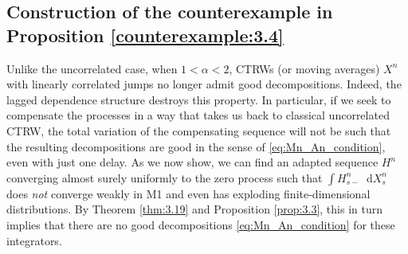 \documentclass[11pt]{article}
\theoremstyle{definition}\newtheorem{example}[theorem]{Example}
\theoremstyle{definition}\newtheorem{counterexample}[theorem]{Counterexample}
\theoremstyle{definition}\newtheorem{remark}[theorem]{Remark}
\theoremstyle{definition}\newtheorem{defi}[theorem]{Definition}
\numberwithin{equation}{section}
\newcommand*\diff{\mathop{}\!\mathrm{d}}								%
\renewcommand{\|}{\; : \, \;}											%
\begin{document}
\subsection{Construction of the counterexample in Proposition \ref{counterexample:3.4}} \label{sec:4.1}
Unlike the uncorrelated case, when $1<\alpha<2$, CTRWs (or moving averages) $X^n$ with linearly correlated jumps no longer admit good decompositions. Indeed, the lagged dependence structure destroys this property. In particular, if we seek to compensate the processes in a way that takes us back to classical uncorrelated CTRW, the total variation of the compensating sequence will not be such that the resulting decompositions are good in the sense of \eqref{eq:Mn_An_condition}, even with just one delay. As we now show, we can find an adapted sequence $H^n$ converging almost surely uniformly to the zero process such that $\int H^n_{s-} \diff X^n_s$ does \emph{not} converge weakly in M1 and even has exploding finite-dimensional distributions. By Theorem \ref{thm:3.19} and Proposition \ref{prop:3.3}, this in turn implies that there are no good decompositions \eqref{eq:Mn_An_condition} for these integrators.


\end{document}
